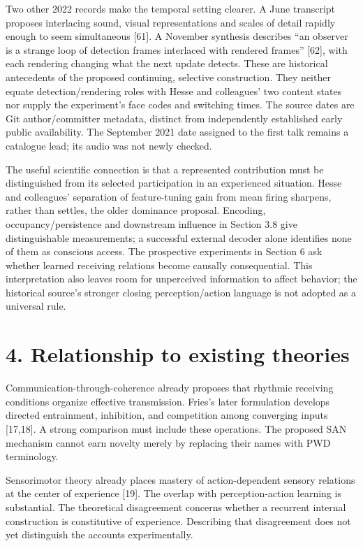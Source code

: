 \documentclass[
  american,
  11pt,
  letterpaper,
]{article}
\newcounter{none} %
\begin{document}
Two other 2022 records make the temporal setting clearer. A June transcript proposes interlacing sound, visual representations and scales of detail rapidly enough to seem simultaneous {[}61{]}. A November synthesis describes ``an observer is a strange loop of detection frames interlaced with rendered frames'' {[}62{]}, with each rendering changing what the next update detects. These are historical antecedents of the proposed continuing, selective construction. They neither equate detection/rendering roles with Hesse and colleagues' two content states nor supply the experiment's face codes and switching times. The source dates are Git author/committer metadata, distinct from independently established early public availability. The September 2021 date assigned to the first talk remains a catalogue lead; its audio was not newly checked.

The useful scientific connection is that a represented contribution must be distinguished from its selected participation in an experienced situation. Hesse and colleagues' separation of feature-tuning gain from mean firing sharpens, rather than settles, the older dominance proposal. Encoding, occupancy/persistence and downstream influence in Section 3.8 give distinguishable measurements; a successful external decoder alone identifies none of them as conscious access. The prospective experiments in Section 6 ask whether learned receiving relations become causally consequential. This interpretation also leaves room for unperceived information to affect behavior; the historical source's stronger closing perception/action language is not adopted as a universal rule.

\section{4. Relationship to existing theories}\label{relationship-to-existing-theories}

Communication-through-coherence already proposes that rhythmic receiving conditions organize effective transmission. Fries's later formulation develops directed entrainment, inhibition, and competition among converging inputs {[}17,18{]}. A strong comparison must include these operations. The proposed SAN mechanism cannot earn novelty merely by replacing their names with PWD terminology.

Sensorimotor theory already places mastery of action-dependent sensory relations at the center of experience {[}19{]}. The overlap with perception-action learning is substantial. The theoretical disagreement concerns whether a recurrent internal construction is constitutive of experience. Describing that disagreement does not yet distinguish the accounts experimentally.
\end{document}
